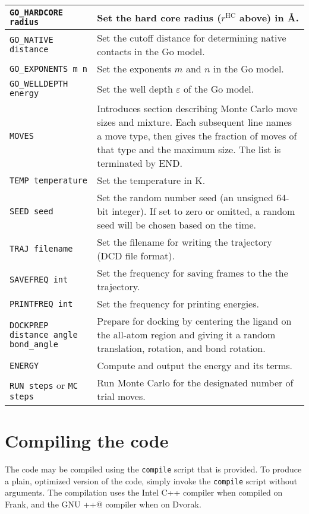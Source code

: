 \documentclass{article}      %
\begin{document}
\begin{longtable}{|l|p{3.25in}|}
\hline
\verb+GO_HARDCORE radius+ & Set the hard core radius ($r^\mathrm{HC}$ above) in \AA. \\
\hline 
\verb+GO_NATIVE distance+ & Set the cutoff distance for determining native contacts in the Go model. \\
\hline
\verb+GO_EXPONENTS m n+ & Set the exponents $m$ and $n$ in the Go model. \\
\hline
\verb+GO_WELLDEPTH energy+ & Set the well depth $\varepsilon$ of the Go model. \\
\hline
\verb+MOVES+ & Introduces section describing Monte Carlo move sizes and mixture.  Each subsequent line names a move type, then gives the fraction of moves of that type and the maximum size.  The list is terminated by END. \\
\hline
\verb+TEMP temperature+& Set the temperature in K. \\
\hline
\verb+SEED seed+ & Set the random number seed (an unsigned 64-bit integer).  If set to zero or omitted, a random seed will be chosen based on the time. \\
\hline
\verb+TRAJ filename+ & Set the filename for writing the trajectory (DCD file format). \\
\hline
\verb+SAVEFREQ int+ & Set the frequency for saving frames to the the trajectory. \\
\hline
\verb+PRINTFREQ int+ & Set the frequency for printing energies. \\
\hline
\verb+DOCKPREP distance angle bond_angle+& Prepare for docking by centering the ligand on the all-atom region and giving it a random translation, rotation, and bond rotation. \\
\hline
\verb+ENERGY+ & Compute and output the energy and its terms. \\
\hline
\verb+RUN steps+ or \verb+MC steps+ & Run Monte Carlo for the designated number of trial moves. \\
\hline
\end{longtable}

\section{Compiling the code}

The code may be compiled using the \verb+compile+ script that is provided.  To produce a plain, optimized version of the code, simply invoke the \verb+compile+ script without arguments.  The compilation uses the Intel C++ compiler when compiled on Frank, and the GNU  \verb@g++@ compiler when on Dvorak.
\end{document}
